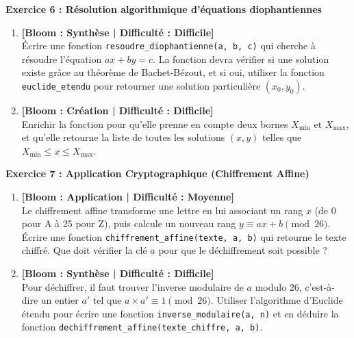 \vspace{0.5cm}

\noindent\textbf{Exercice 6 : Résolution algorithmique d'équations diophantiennes} 
\begin{enumerate}
    \item \textbf{[Bloom : Synthèse | Difficulté : Difficile]} \\
    Écrire une fonction \texttt{resoudre\_diophantienne(a, b, c)} qui cherche à résoudre l'équation $ax + by = c$. La fonction devra vérifier si une solution existe grâce au théorème de Bachet-Bézout, et si oui, utiliser la fonction \texttt{euclide\_etendu} pour retourner une solution particulière $(x_0, y_0)$.
    \item \textbf{[Bloom : Création | Difficulté : Difficile]} \\
    Enrichir la fonction pour qu'elle prenne en compte deux bornes $X_{\text{min}}$ et $X_{\text{max}}$, et qu'elle retourne la liste de toutes les solutions $(x, y)$ telles que $X_{\text{min}} \le x \le X_{\text{max}}$.
\end{enumerate}

\vspace{0.5cm}

\noindent\textbf{Exercice 7 : Application Cryptographique (Chiffrement Affine)} 
\begin{enumerate}
    \item \textbf{[Bloom : Application | Difficulté : Moyenne]} \\
    Le chiffrement affine transforme une lettre en lui associant un rang $x$ (de 0 pour A à 25 pour Z), puis calcule un nouveau rang $y \equiv ax + b \pmod{26}$. Écrire une fonction \texttt{chiffrement\_affine(texte, a, b)} qui retourne le texte chiffré. Que doit vérifier la clé $a$ pour que le déchiffrement soit possible ?
    \item \textbf{[Bloom : Synthèse | Difficulté : Difficile]} \\
    Pour déchiffrer, il faut trouver l'inverse modulaire de $a$ modulo 26, c'est-à-dire un entier $a'$ tel que $a \times a' \equiv 1 \pmod{26}$. Utiliser l'algorithme d'Euclide étendu pour écrire une fonction \texttt{inverse\_modulaire(a, n)} et en déduire la fonction \texttt{dechiffrement\_affine(texte\_chiffre, a, b)}.
\end{enumerate}

\vspace{0.5cm}

